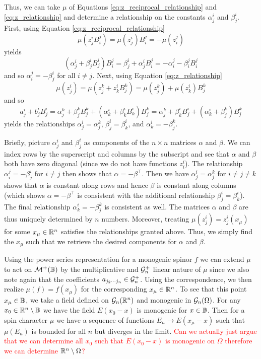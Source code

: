 Thus, we can take $\mu$ of Equations \ref{eq:z_reciprocal_relationship} and \ref{eq:z_relationship} and determine a relationship on the constants $\alpha_j^i$ and $\beta_j^i$. First, using Equation \ref{eq:z_reciprocal_relationship}
\[
\mu(z_j^i B_i^j) = \mu(z_j^i) B_i^j = -\mu(z_i^j)
\]
yields
\[
(\alpha_j^i + \beta_j^iB_j^i)B_i^j = \beta_j^i + \alpha_j^i B_i^j = - \alpha_i^j - \beta_i^j B_i^j 
\]
and so $\alpha_i^j = -\beta_j^i$ for all $i \neq j$. Next, using Equation \ref{eq:z_relationship}
\[
\mu(z_j^i) = \mu(z_j^k + z_k^i B_j^k) = \mu(z_j^k)+\mu(z_k^i)B_j^k
\]
and so
\[
a_j^i + b_j^i B_j^i = \alpha_j^k + \beta_j^kB_j^k + (\alpha_k^i + \beta_k^i B_k^i)B_j^k = \alpha_j^k + \beta_k^i B_j^i + (\alpha_k^i + \beta_j^k)B_j^k
\]
yields the relationships $\alpha_j^i = \alpha_j^k$, $\beta_j^i = \beta_k^i$, and $\alpha_k^i=-\beta_j^k$. 

Briefly, picture $\alpha_j^i$ and $\beta_j^i$ as components of the $n \times n$ matrices $\alpha$ and $\beta$.  We can index rows by the superscript and columns by the subscript and see that $\alpha$ and $\beta$ both have zero diagonal (since we do not have functions $z_i^i$). The relationship $\alpha_i^j = -\beta_j^i$ for $i\neq j$ then shows that $\alpha = -\beta^\top$.  Then we have $\alpha_j^i = \alpha_j^k$ for $i\neq j \neq k$ shows that $\alpha$ is constant along rows and hence $\beta$ is constant along columns (which shows $\alpha = -\beta^\top$ is consistent with the additional relationship $\beta_j^i = \beta_k^i$). The final relationship $\alpha_k^i = -\beta_j^k$ is consistent as well. The matrices $\alpha$ and $\beta$ are thus uniquely determined by $n$ numbers.  Moreover, treating $\mu(z_j^i)=z_j^i(x_\mu)$ for some $x_\mu \in \mathbb{R}^n$ satisfies the relationships granted above. Thus, we simply find the $x_\mu$ such that we retrieve the desired components for $\alpha$ and $\beta$.  

Using the power series representation for a monogenic spinor $f$ we can extend $\mu$ to act on $\mathcal{M}^+(\mathbb{B})$ by the multiplicative and $\mathcal{G}_n^+$ linear nature of $\mu$ since we also note again that the coefficients $a_{j_2 \cdots j_n} \in \mathcal{G}_n^+$. Using the correspondence, we then realize $\mu(f)=f(x_\mu)$ for the corresponding $x_\mu \in \mathbb{R}^n$. To see that this point $x_\mu \in \mathbb{B}$, we take a field defined on $\mathcal{G}_n(\mathbb{R}^n)$ and monogenic in $\mathcal{G}_n(\Omega)$. For any $x_0 \in \mathbb{R}^n \setminus \mathbb{B}$ we have the field $E(x_0 - x)$ is monogenic for $x\in \mathbb{B}$. Then for a spin character $\mu$ we have a sequence of functions $E_n \to E(x_\mu - x)$ such that $\mu(E_n)$ is bounded for all $n$ but diverges in the limit.   \textcolor{red}{Can we actually just argue that we can determine all $x_0$ such that $E(x_0-x)$ is monogenic on $\Omega$ therefore we can determine $\mathbb{R}^n \setminus \Omega$?}

